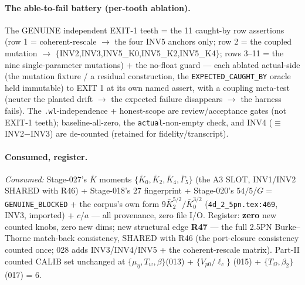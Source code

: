 \paragraph{The able-to-fail battery (per-tooth ablation).}
The GENUINE independent EXIT-1 teeth = the 11 caught-by row assertions (row 1 = coherent-rescale \(\to\) the four INV5
anchors only; row 2 = the coupled mutation \(\to\) \(\{\)INV2,INV3,INV5\_K0,INV5\_K2,INV5\_K4\(\}\); rows 3--11 = the nine
single-parameter mutations) + the no-float guard --- each ablated actual-side (the mutation fixture / a residual
construction, the \texttt{EXPECTED\_CAUGHT\_BY} oracle held immutable) to EXIT 1 at its own named assert, with a coupling
meta-test (neuter the planted drift \(\to\) the expected failure disappears \(\to\) the harness fails). The
\texttt{.wl}-independence + honest-scope are review/acceptance gates (not EXIT-1 teeth); baseline-all-zero, the
\texttt{actual}-non-empty check, and INV4 (\(\equiv\) INV2\(-\)INV3) are de-counted (retained for fidelity/transcript).

\paragraph{Consumed, register.}
\emph{Consumed:} Stage-027's \(\bar K\) moments \(\{\bar K_0,\bar K_2,\bar K_4,\bar\Gamma_5\}\) (the A3 SLOT, INV1/INV2
SHARED with R46) + Stage-018's \(27\) fingerprint + Stage-020's \(54/5\)/\(G=\)\texttt{GENUINE\_BLOCKED} + the corpus's own
form \(9\bar K_2^{5/2}/\bar K_0^{3/2}\) (\texttt{4d\_2\_5pn.tex:469}, INV3, imported) + \(c\)/\(a\) --- all provenance, zero
file I/O. Register: \textbf{zero} new counted knobs, zero new dims; new structural edge \textbf{R47} --- the full 2.5PN
Burke--Thorne match-back consistency, SHARED with R46 (the port-closure consistency counted once; 028 adds INV3/INV4/INV5 +
the coherent-rescale matrix). Part-II counted CALIB set unchanged at \(\{\mu_\eta,T_w,\beta\}\)(013) + \(\{V_{p0}/\ell_c\}\)
(015) + \(\{T_\Omega,\beta_2\}\)(017) = 6.


